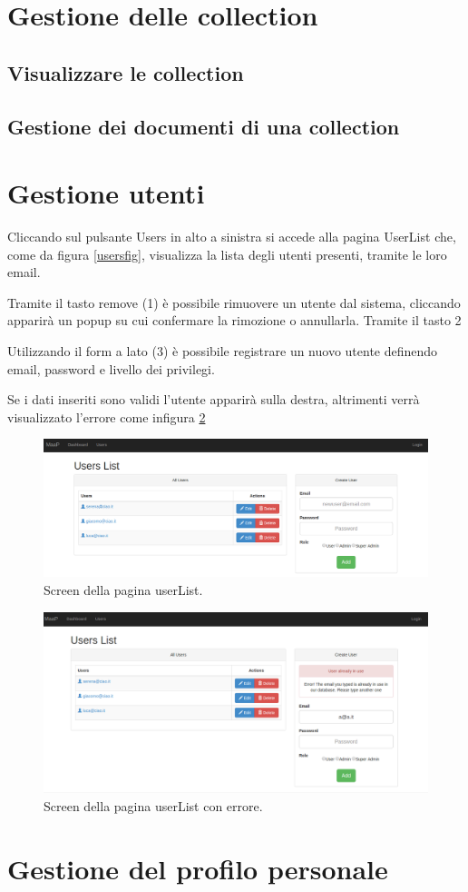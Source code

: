 \section{Gestione delle collection}
\subsection{Visualizzare le collection}
\subsection{Gestione dei documenti di una collection}

\section{Gestione utenti}
\label{nuovoutente}
Cliccando sul pulsante Users in alto a sinistra si accede alla pagina UserList che, come da figura \ref{usersfig}, visualizza la lista degli utenti presenti, tramite le loro email.

Tramite il tasto remove (1) è possibile rimuovere un utente dal sistema, cliccando apparirà un popup su cui confermare la rimozione o annullarla. Tramite il tasto 2 %

Utilizzando il form a lato (3) è possibile registrare un nuovo utente definendo email, password e livello dei privilegi.

Se i dati inseriti sono validi l'utente apparirà sulla destra, altrimenti verrà visualizzato l'errore come infigura \ref{userserrorfig}

\begin{figure}[h]
\label{userslist}
	\centering \includegraphics[width=1\textwidth]{userList.png}
	\caption{Screen della pagina userList.}
\end{figure}

\begin{figure}[h]
\label{userserrorfig}
	\centering \includegraphics[width=1\textwidth]{userListError.png}
	\caption{Screen della pagina userList con errore. }
\end{figure}

\section{Gestione del profilo personale}





